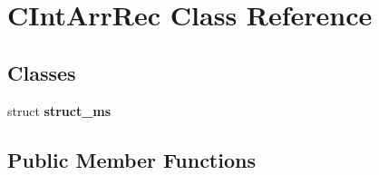 \hypertarget{class_c_int_arr_rec}{\section{C\-Int\-Arr\-Rec Class Reference}
\label{class_c_int_arr_rec}
}
\subsection*{Classes}
\begin{DoxyCompactItemize}
\item 
struct {\bfseries struct\-\_\-ms}
\end{DoxyCompactItemize}
\subsection*{Public Member Functions}
